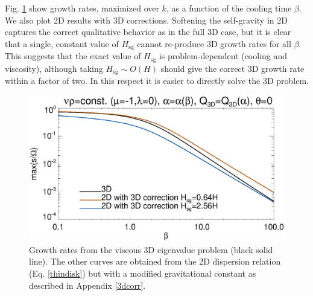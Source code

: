 Fig. \ref{3d_visc} show growth rates, maximized over $k$, as a
function of the cooling time $\beta$. We also plot 2D results with 3D
corrections. Softening the self-gravity in 2D captures the correct 
qualitative behavior as in the full 3D case, but it is clear that a
single, constant value of $H_\mathrm{sg}$ cannot re-produce 3D growth 
rates for all $\beta$. 
This suggests that the exact value of
$H_\mathrm{sg}$ is problem-dependent (cooling and viscosity), although taking
$H_\mathrm{sg}\sim O(H)$ should give the correct 3D growth rate within
a factor of two. In this respect it is easier to
directly solve the 3D problem.  

\begin{figure}
  \includegraphics[width=\linewidth,clip=true,trim=0cm 0.cm 0.23cm
    0.0cm]{figures/growth_visc3d}
  \caption{Growth rates from the viscous 3D eigenvalue problem (black solid
    line). The other curves are obtained from the 2D dispersion
    relation (Eq. \ref{thindisk}) but with a modified gravitational
    constant as described in Appendix \ref{3dcorr}. \label{3d_visc}}
\end{figure}
